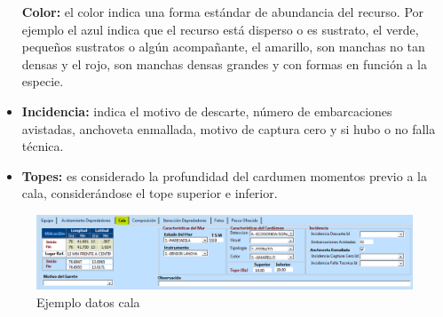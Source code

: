 \documentclass[a4paper,oneside,11pt]{book}
\begin{document}
\begin{itemize}
\subitem \textbf{Color:}  el color indica una forma estándar de abundancia del recurso. Por ejemplo el azul indica que el recurso está disperso o es sustrato, el verde,  pequeños sustratos  o algún acompañante, el amarillo, son manchas no tan densas y el  rojo, son manchas densas grandes y con formas en función a la especie.

\item{\textbf{Incidencia:}} indica el motivo de descarte, número de embarcaciones avistadas, anchoveta enmallada, motivo de captura cero y si hubo o no falla técnica.

\item{\textbf{Topes:}} es considerado la profundidad del cardumen momentos previo a la cala, considerándose el tope superior e inferior.

\end{itemize}

\begin{figure}
\centering
\includegraphics[width=0.95\linewidth]{./imagen_Manual_PBP/cala2}
\caption{Ejemplo datos cala}
\label{fig:cala2}
\end{figure}
\end{document}
